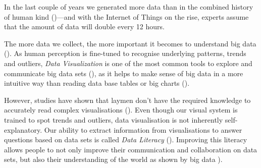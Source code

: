 
In the last couple of years we generated more data than in the combined history of human kind (\cite{helbing2019will})---and with the Internet of Things on the rise, experts assume that the amount of data will double every 12 hours.

The more data we collect, %
the more important it becomes to understand big data (\cite{borner_data_2019}). As human perception is fine-tuned to recognise underlying patterns, trends and outliers, \emph{Data Visualization} is one of the most common tools to explore and communicate big data sets (\cite{heer_tour_2010}), as it helps to make sense of big data in a more intuitive way than reading data base tables or big charts (\cite{donalek_immersive_2014}).

However, studies have shown that laymen don't have the required knowledge to accurately read complex visualisations (\cite{borner_investigating_2016}). %
Even though our visual system is trained to spot trends and outliers, data visualisation is not inherently self-explanatory. Our ability to extract information from visualisations to answer questions based on data sets is called \emph{Data Literacy} (\cite{boy_principled_2014}). Improving this literacy allows people to not only improve their communication and collaboration on data sets, but also their understanding of the world as shown by big data \cite{borner_data_2019}). 
